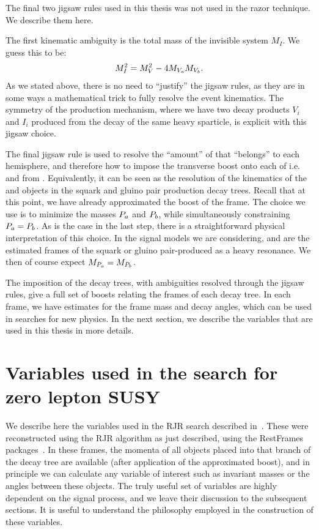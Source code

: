 The final two jigsaw rules used in this thesis was not used in the razor technique.
We describe them here.

The first kinematic ambiguity is the total mass of the invisible system $M_I$.
We guess this to be:
\begin{align}
M_I^2 = M_V^2 - 4 M_{V_a} M_{V_b}.
\end{align}
As we stated above, there is no need to ``justify'' the jigsaw rules, as they are in some ways a mathematical trick to fully resolve the event kinematics.
The symmetry of the production mechanism, where we have two decay products $V_i$ and $I_i$ produced from the decay of the same heavy sparticle, is explicit with this jigsaw choice.

The final jigsaw rule is used to resolve the ``amount'' of \met that ``belongs'' to each hemisphere, and therefore how to impose the transverse boost onto each of i.e. \Pa and \Pb from \PP.
Equivalently, it can be seen as the resolution of the kinematics of the \Ia and \Ib objects in the squark and gluino pair production decay trees.
Recall that at this point, we have already approximated the boost of the \PP frame.
The choice we use is to minimize the masses $P_a$ and $P_b$, while simultaneously constraining $P_a = P_b$.
As is the case in the last step, there is a straightforward physical interpretation of this choice.
In the signal models we are considering, \Pa and \Pb are the estimated frames of the squark or gluino pair-produced as a heavy resonance.
We then of course expect $M_{P_a} = M_{P_b}$.

The imposition of the decay trees, with ambiguities resolved through the jigsaw rules, give a full set of boosts relating the frames of each decay tree.
In each frame, we have estimates for the frame mass and decay angles, which can be used in searches for new physics.
In the next section, we describe the variables that are used in this thesis in more details.

\section{Variables used in the search for zero lepton SUSY}

We describe here the variables used in the RJR search described in~\cite{ATLAS-CONF-2016-078}.
These were reconstructed using the RJR algorithm as just described, using the RestFrames packages~\cite{RestFrames}.
In these frames, the momenta of all objects placed into that branch of the decay tree are available (after application of the approximated boost), and in principle we can calculate any variable of interest such as invariant masses or the angles between these objects.
The truly useful set of variables are highly dependent on the signal process, and we leave their discussion to the subsequent sections.
It is useful to understand the philosophy employed in the construction of these variables.

